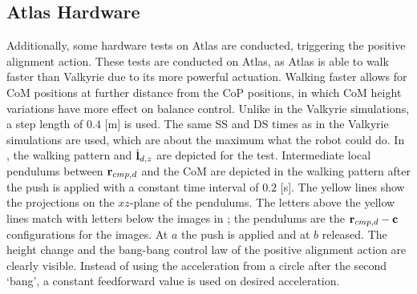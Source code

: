 \subsection{Atlas Hardware}
Additionally, some hardware tests on Atlas are conducted, triggering the positive alignment action. These tests are conducted on Atlas, as Atlas is able to walk faster than Valkyrie due to its more powerful actuation. Walking faster allows for \ac{CoM} positions at further distance from the \ac{CoP} positions, in which \ac{CoM} height variations have more effect on balance control. Unlike in the Valkyrie simulations, a step length of $0.4$ [m] is used. The same \ac{SS} and \ac{DS} times as in the Valkyrie simulations are used, which are about the maximum what the robot could do. In , the walking pattern and $\dot{\mathbf{l}}_{d,z}$ are depicted for the test. Intermediate local pendulums between $\mathbf{r}_{cmp,d}$ and the \ac{CoM} are depicted in the walking pattern after the push is applied with a constant time interval of $0.2$ [s]. The yellow lines show the projections on the $xz$-plane of the pendulums. The letters above the yellow lines match with letters below the images in ; the pendulums are the $\mathbf{r}_{cmp,d}-\mathbf{c}$ configurations for the images. At $a$ the push is applied and at $b$ released. The height change and the bang-bang control law of the positive alignment action are clearly visible. Instead of using the acceleration from a circle after the second `bang', a constant feedforward value is used on desired acceleration.
